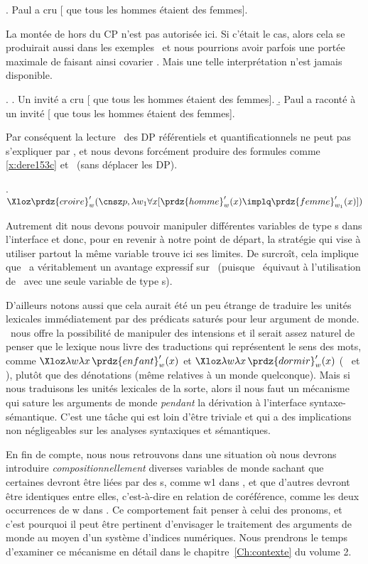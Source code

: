 \fussy


\ex.
Paul a cru [ que tous les hommes étaient des femmes].

La montée de  hors du CP n'est pas autorisée ici.  
Si c'était le cas, alors cela se produirait aussi dans les exemples \Next\ et nous pourrions avoir parfois une portée maximale de  faisant ainsi covarier .  Mais une telle interprétation n'est jamais disponible.

\ex.
\a. Un invité a cru [ que tous les hommes étaient des femmes].
\b. Paul a raconté à un invité [ que tous les hommes étaient des femmes].


Par conséquent la lecture \dere\ des DP référentiels et quantificationnels ne peut pas s'expliquer par \QRa, et nous devons forcément produire des formules comme \ref{x:dere153c} et \Next\ (sans déplacer les DP).  

\ex.
\(\Xloz\prdz{croire}'_w(\cnsz p,\lambda w_1\forall x[\prdz{homme}'_w(x)\implq\prdz{femme}'_{w_1}(x)])\)

Autrement dit nous devons pouvoir manipuler différentes variables de type \typ s dans l'interface %
et donc, pour en revenir à notre point de départ, la stratégie qui vise à utiliser partout la même variable trouve ici ses limites.
De surcroît, cela implique que \LOz\ a véritablement un avantage expressif sur \LO\ (puisque \LO\ équivaut à l'utilisation de \LOz\ avec une seule variable de type \typ s).

\sloppy
D'ailleurs notons aussi que cela aurait été un peu étrange de traduire les unités lexicales immédiatement par des prédicats saturés pour leur argument de monde.  \LOz\ nous offre la possibilité de manipuler des intensions et il serait assez naturel de penser que le lexique nous livre des traductions qui représentent le sens des mots, comme $\Xloz\lambda w\lambda x\,\prdz{enfant}'_w(x)$ et $\Xloz\lambda w\lambda x\,\prdz{dormir}'_w(x)$ (\ie\  et ), plutôt que des dénotations (même relatives à un monde quelconque).
Mais si nous traduisons les unités lexicales de la sorte, alors il nous faut un mécanisme qui sature les arguments de monde \emph{pendant} la dérivation à l'interface syntaxe-sémantique. 
C'est une tâche qui est loin d'être triviale et qui a des implications non négligeables sur les analyses syntaxiques et sémantiques.

\fussy

En fin de compte, nous nous retrouvons dans une situation où nous devrons introduire \emph{compositionnellement} diverses variables de monde sachant que certaines devront être liées par des \labstraction s, comme \vrbzi w1 dans \Last, et que d'autres devront être identiques entre elles, c'est-à-dire en relation de coréférence, comme les deux occurrences de \vrbz w dans \Last.  Ce comportement fait penser à celui des pronoms, et c'est pourquoi il peut être pertinent d'envisager le traitement des arguments de monde au moyen d'un système d'indices numériques. Nous prendrons le temps d'examiner ce mécanisme en détail dans le chapitre~\ref{Ch:contexte} du volume 2.

